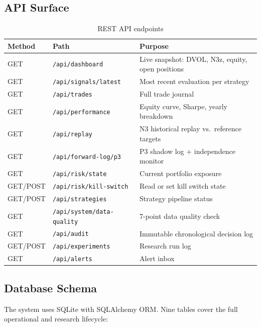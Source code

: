 \documentclass[12pt, a4paper]{article}
\theoremstyle{definition}
\begin{document}
\subsection{API Surface}

\begin{table}[H]
\centering
\caption{REST API endpoints}
\begin{tabularx}{\linewidth}{llX}
\toprule
\textbf{Method} & \textbf{Path} & \textbf{Purpose} \\
\midrule
GET & \texttt{/api/dashboard}               & Live snapshot: DVOL, N3z, equity, open positions \\
GET & \texttt{/api/signals/latest}          & Most recent evaluation per strategy \\
GET & \texttt{/api/trades}                  & Full trade journal \\
GET & \texttt{/api/performance}             & Equity curve, Sharpe, yearly breakdown \\
GET & \texttt{/api/replay}                  & N3 historical replay vs.\ reference targets \\
GET & \texttt{/api/forward-log/p3}          & P3 shadow log + independence monitor \\
GET & \texttt{/api/risk/state}              & Current portfolio exposure \\
GET/POST & \texttt{/api/risk/kill-switch}   & Read or set kill switch state \\
GET/POST & \texttt{/api/strategies}         & Strategy pipeline status \\
GET & \texttt{/api/system/data-quality}     & 7-point data quality check \\
GET & \texttt{/api/audit}                   & Immutable chronological decision log \\
GET/POST & \texttt{/api/experiments}        & Research run log \\
GET & \texttt{/api/alerts}                  & Alert inbox \\
\bottomrule
\end{tabularx}
\end{table}

\subsection{Database Schema}

The system uses SQLite with SQLAlchemy ORM. Nine tables cover the full
operational and research lifecycle:
\end{document}
